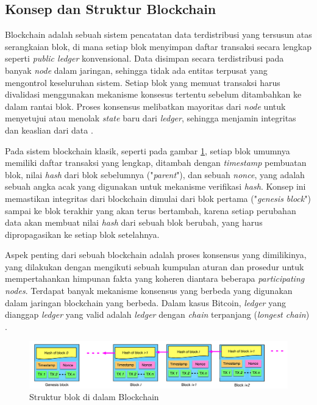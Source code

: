 \subsection{Konsep dan Struktur Blockchain}
\label{subsec:konsep-struktur-blockchain}

Blockchain adalah sebuah sistem pencatatan data terdistribusi yang tersusun atas serangkaian blok, di mana setiap blok menyimpan daftar transaksi secara lengkap seperti \textit{public ledger} konvensional. Data disimpan secara terdistribusi pada banyak \textit{node} dalam jaringan, sehingga tidak ada entitas terpusat yang mengontrol keseluruhan sistem. Setiap blok yang memuat transaksi harus divalidasi menggunakan mekanisme konsesus tertentu sebelum ditambahkan ke dalam rantai blok. Proses konsensus melibatkan mayoritas dari \textit{node} untuk menyetujui atau menolak \textit{state} baru dari \textit{ledger}, sehingga menjamin integritas dan keaslian dari data \parencite{zheng2018blockchain,nofer2017blockchain}.

Pada sistem blockchain klasik, seperti pada gambar \ref{image:struktur-blockchain}, setiap blok umumnya memiliki daftar transaksi yang lengkap, ditambah dengan \textit{timestamp} pembuatan blok, nilai \textit{hash} dari blok sebelumnya ("\textit{parent}"), dan sebuah \textit{nonce}, yang adalah sebuah angka acak yang digunakan untuk mekanisme verifikasi \textit{hash}.
Konsep ini memastikan integritas dari blockchain dimulai dari blok pertama ("\textit{genesis block}") sampai ke blok terakhir yang akan terus bertambah, karena setiap perubahan data akan membuat nilai \textit{hash} dari sebuah blok berubah, yang harus dipropagasikan ke setiap blok setelahnya.

Aspek penting dari sebuah blockchain adalah proses konsensus yang dimilikinya, yang dilakukan dengan mengikuti sebuah kumpulan aturan dan prosedur untuk mempertahankan himpunan fakta yang koheren diantara beberapa \textit{participating nodes}. Terdapat banyak mekanisme konsensus yang berbeda yang digunakan dalam jaringan blockchain yang berbeda. Dalam kasus Bitcoin, \textit{ledger} yang dianggap \textit{ledger} yang valid adalah \textit{ledger} dengan \textit{chain} terpanjang (\textit{longest chain}) \parencite{swanson2015consensus}.

\begin{figure}[ht]
	\centering
	\includegraphics[width=1\textwidth]{resources/chapter-2/struktur-blockchain.png}
	\caption{Struktur blok di dalam Blockchain \parencite{zheng2018blockchain}}
	\label{image:struktur-blockchain}
\end{figure}

